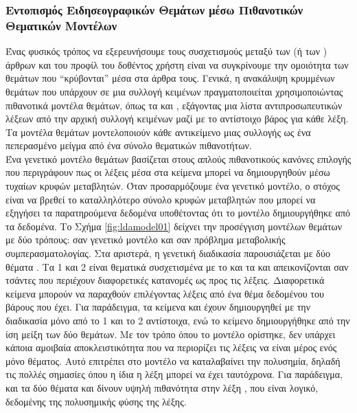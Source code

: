 {{{{{{\subsubsection{Εντοπισμός Ειδησεογραφικών Θεμάτων μέσω Πιθανοτικών Θεματικών Μοντέλων}

Ένας φυσικός τρόπος να εξερευνήσουμε τους συσχετισμούς μεταξύ των { (ή των {) άρθρων 
και του προφίλ του δοθέντος χρήστη είναι να συγκρίνουμε την ομοιότητα των θεμάτων που “κρύβονται” μέσα στα άρθρα τους. 
Γενικά, η ανακάλυψη κρυμμένων θεμάτων που υπάρχουν σε μια συλλογή κειμένων πραγματοποιείται χρησιμοποιώντας 
πιθανοτικά μοντέλα θεμάτων, όπως τα {} και {} \cite{Lda02}, εξάγοντας μια λίστα αντιπροσωπευτικών λέξεων 
από την αρχική συλλογή κειμένων μαζί με το αντίστοιχο βάρος για κάθε λέξη. 
Τα μοντέλα θεμάτων μοντελοποιούν κάθε αντικείμενο μιας συλλογής ως ένα πεπερασμένο μείγμα από ένα σύνολο θεματικών πιθανοτήτων. \\

Ένα γενετικό {} μοντέλο θεμάτων βασίζεται στους απλούς πιθανοτικούς κανόνες επιλογής {} 
που περιγράφουν πως οι λέξεις μέσα στα κείμενα μπορεί να δημιουργηθούν μέσω τυχαίων κρυφών μεταβλητών. 
Όταν προσαρμόζουμε ένα γενετικό μοντέλο, ο στόχος είναι να βρεθεί το καταλληλότερο σύνολο κρυφών μεταβλητών 
που μπορεί να εξηγήσει τα παρατηρούμενα δεδομένα υποθέτοντας ότι το μοντέλο δημιουργήθηκε από τα δεδομένα. 
Το Σχήμα \ref{fig:ldamodel01} δείχνει την προσέγγιση μοντέλων θεμάτων με δύο τρόπους: 
σαν γενετικό μοντέλο και σαν πρόβλημα μεταβολικής συμπερασματολογίας. 
Στα αριστερά, η γενετική διαδικασία παρουσιάζεται με δύο θέματα {}. 
Τα {} 1 και 2 είναι θεματικά συσχετισμένα με το {} και τα {} 
και απεικονίζονται σαν τσάντες που περιέχουν διαφορετικές κατανομές ως προς τις λέξεις. 
Διαφορετικά κείμενα μπορούν να παραχθούν επιλέγοντας λέξεις από ένα θέμα δεδομένου του βάρους που έχει. 
Για παράδειγμα, τα κείμενα {} και {} έχουν δημιουργηθεί με την διαδικασία \textit{{}} 
μόνο από το {} 1 και το {} 2 αντίστοιχα, 
ενώ το κείμενο {} δημιουργήθηκε από την ίση μείξη των δύο θεμάτων. 
Με τον τρόπο όπου το μοντέλο ορίστηκε, δεν υπάρχει κάποια αμοιβαία αποκλειστικότητα 
που να περιορίζει τις λέξεις να είναι μέρος ενός μόνο θέματος. 
Αυτό επιτρέπει στο μοντέλο να καταλαβαίνει την πολυσημία, δηλαδή τις  πολλές σημασίες όπου η ίδια η λέξη μπορεί να έχει ταυτόχρονα. 
Για παράδειγμα, και τα δύο θέματα {} και {} δίνουν υψηλή πιθανότητα στην λέξη \textit{{}}, 
που είναι λογικό, δεδομένης της πολυσημικής φύσης της λέξης.\\

}}}}}}}}
